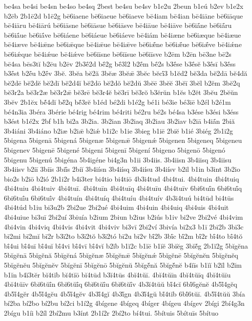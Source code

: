{be4sa
be4si
be4sn
be4so
be4sq
2best
be4su
be4sv
b1e2u
2beun
b1eú
b2ev
b1e2x
b2ēb
2b1ē2d
b1ē2g
bē6iaene
bē6iaeue
bē6iaeve
bē4iam
bē4ian
bē4iāne
bē6iāque
bē4iāru
bē4iārú
bē6iāsne
bē6iāsue
bē6iāsve
bē4iāue
bē4iāve
bē6iā́ne
bē6iā́ru
bē6iā́ue
bē6iā́ve
bē6iáene
bē6iáeue
bē6iáeve
bē4iám
bē4iæne
bē6iæque
bē4iæue
bē4iæve
bē4iǣne
bē6iǣque
bē4iǣue
bē4iǣve
bē6iǣ́ne
bē6iǣ́ue
bē6iǣ́ve
bē4iǽne
bē6iǽque
bē4iǽue
bē4iǽve
bē6iīsne
bē6iīsue
bē6iīsve
b2ēm
b2ēn
bē3ne
bē2s
bē4sa
bēs3tĭ
b2ēu
b2ēv
2b3ḗ2d
bḗ2g
bḗ3l2
b2ḗm
bḗ2s
b3ḗse
b3ḗsĕ
b3ḗsī
b3ḗss
b3ḗst
b2ḗu
b2ḗv
3bĕ.
3bĕa
bĕ2ă
3bĕæ
3bĕǣ
3bĕc
bĕcī́3
b1ĕd2
bĕ3da
bĕ2dā
bĕ4dă
bĕ2dē
bĕ2dĕ
bĕ2dī
bĕ2d4ĭ
bĕ2dō
bĕ2dŏ
bĕ2dŭ
3bĕē
3bĕĕ
3bĕī
3bĕl
b2ĕm
3bĕ2q
bĕ3r2a
bĕ3r2æ
bĕ3r2ǣ
bĕ3rē
bĕ3r4ĕ
bĕ3rī
bĕ3rŏ
b3ĕrŭn
b1ĕs
b2ĕt
3bĕu
2bĕŭn
3bĕv
2b1ĕx
bĕ́4dĭ
bĕ́2q
bĕ́3rĕ
b1éd
bé2di
b1é2g
bé1i
bé3ie
bé3iē
b2él
b2é1m
bé4n3ia
3béra
3bérie
bé4rig
bé4rim
bé4riti
bé2ru
bé2s
bé4sa
b3ése
b3ési
b3éss
b3ést
b1é2x
2bf
b1h
bi2a
3b2ia.
3b2ian
3b2iaq
3b2iau
3b2iav
b2iā
b4iā́n
2biă
3b4iáni
3b4iáno
b2iæ
b2iǣ
b2iǽ
b1i2c
b1ie
3bieg
b1iē
2biĕ
b1ié
3biég
2b1i2g
5bigena
5bigenā
5bigená
5bigenæ
5bigenǣ
5bigenǽ
5bigenen
5bigeneq
5bigeneu
5bigenev
5bigenē
5bigené
5bigeni
5bigenī
5bigení
5bigeno
5bigenō
5bigenó
5bigenu
5bigenú
5bigéna
5b4igéne
bi4g3n
b1ii
3b4iis.
3b4iisn
3b4iisq
3b4iisu
3b4iisv
b2iī
3biīs
3biī́s
2biĭ
3b4iísn
3b4iísq
3b4iísu
3b4iísv
b2il
b1in
b3int
3b2io
bio2s
b2iō
b2ió
2b1i2r
b4i3ter
bi4tio
bi4tiō
4b3i4tud
4bi4tui.
4bi4tuin
4bi4tuiq
4bi4tuiu
4bi4tuiv
4bi4tuī.
4bi4tuīn
4bi4tuīq
4bi4tuīu
4bi4tuīv
6bi6tuī́n
6bi6tuī́q
6bi6tuī́u
6bi6tuī́v
4bi4tuín
4bi4tuíq
4bi4tuíu
4bi4tuív
4b3i4tuú
bi4tūd
bi4tūs
4bi4túd
b1iu
bi3u2b
2bi2ue
2bi2ué
4bi4uim
4bi4uin
4bi4uiq
4bi4uis
4bi4uit
4bi4uiue
bi3uī
2bi2uí
3biuía
b2ium
2biun
b2ius
b2iús
b1iv
bi2ve
2bi2vé
4bi4vim
4bi4vin
4bi4viq
4bi4vis
4bi4vit
4bi4viv
bi3vī
2bi2ví
3bivía
bi2x3
b1ī
2bī2b
3bī3c
bī2mi
bī2mĭ
bī2r
b3ī2to
b3ī2tŏ
b3ī2tó
bī2u
bī2v
bī́2b
3bī́c
bī́2m
bī́2r
bī́4to
bī́4tŏ
bī́4ui
bī́4uī
bī́4uĭ
bī́4vi
bī́4vī
bī́4vĭ
b2ĭb
b1ĭ2c
b1ĭē
b1ĭĕ
3bĭĕg
3bĭĕ́g
2b1ĭ2g
5bĭgĕna
5bĭgĕnā
5bĭgĕnă
5bĭgĕná
5bĭgĕnæ
5bĭgĕnǣ
5bĭgĕnǽ
5bĭgĕnē
5bĭgĕnĕn
5bĭgĕnĕq
5bĭgĕnĕu
5bĭgĕnĕv
5bĭgĕnī
5bĭgĕnō
5bĭgĕnŭ
5bĭgĕ́nă
5bĭgĕ́nĕ
b4ĭīs
b1ĭĭ
b2ĭl
b2ĭm
b1ĭn
b4ĭ3tĕr
bĭ4tĭb
bĭ4tĭō
bĭ4tūd
b3ĭ4tūs
4bĭ4tŭī.
4bĭ4tŭīn
4bĭ4tŭīq
4bĭ4tŭīu
4bĭ4tŭīv
6bĭ6tŭī́n
6bĭ6tŭī́q
6bĭ6tŭī́u
6bĭ6tŭī́v
4b3ĭ4tŭŭ
bĭ́4cĭ
6bĭ́6gĕnĕ
4b5ĭ́4gĕq
4b5ĭ́4gĕr
4b5ĭ́4gĕu
4b5ĭ́4gĕv
4b3ĭ́4gĭ
4b3ĭ́gn
4b3ĭ́4gŭ
bĭ́4tĭb
6bĭ́6tŭī.
4b5ĭ́4tŭŭ
3bía
bí2ba
bí2bo
bí2bu
bí2ci
b1í2g
4bígene
4bígeq
4bíger
4bígeu
4bígev
2bígi
2bí4g3n
2bígu
b1íi
b2íl
2bí2mu
b3ínt
2b1í2r
2bí2to
bí4tui.
5bítuis
5bítuīs
5bítuo
}
